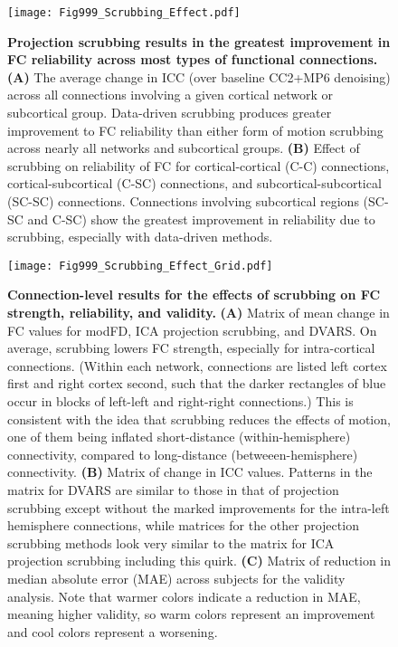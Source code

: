 \documentclass{article}
\begin{document}
\begin{figure}
    \centering
    \texttt{[image: Fig999\_Scrubbing\_Effect.pdf]}
    \caption{\small \textbf{Projection scrubbing results in the greatest improvement in FC reliability across most types of functional connections.}
      \textbf{(A)} The average change in ICC (over baseline CC2+MP6 denoising)
      across all connections involving a given cortical network or subcortical
      group. Data-driven scrubbing produces greater improvement to FC reliability
      than either form of motion scrubbing across nearly all networks
      and subcortical groups. \textbf{(B)} Effect of scrubbing on reliability of
      FC for cortical-cortical (C-C) connections, cortical-subcortical (C-SC)
      connections, and subcortical-subcortical (SC-SC) connections. Connections
      involving subcortical regions (SC-SC and C-SC) show the greatest
      improvement in reliability due to scrubbing, especially with data-driven
      methods.}
    \label{app:fig:ICCexpanded}
\end{figure}

\begin{figure}
    \centering
    \texttt{[image: Fig999\_Scrubbing\_Effect\_Grid.pdf]}
    \caption{\small \textbf{Connection-level results for the effects of scrubbing on FC strength, reliability, and validity.} \textbf{(A)} Matrix of mean change in FC values for modFD, ICA projection scrubbing, and DVARS. On average, scrubbing lowers FC strength, especially for intra-cortical connections. (Within each network, connections are listed left cortex first and right cortex second, such that the darker rectangles of blue occur in blocks of left-left and right-right connections.) This is consistent with the idea that scrubbing reduces the effects of motion, one of them being inflated short-distance (within-hemisphere) connectivity, compared to long-distance (betweeen-hemisphere) connectivity. \textbf{(B)} Matrix of change in ICC values. Patterns in the matrix for DVARS are similar to those in that of projection scrubbing except without the marked improvements for the intra-left hemisphere connections, while matrices for the other projection scrubbing methods look very similar to the matrix for ICA projection scrubbing including this quirk. \textbf{(C)} Matrix of reduction in median absolute error (MAE) across subjects for the validity analysis. Note that warmer colors indicate a reduction in MAE, meaning higher validity, so warm colors represent an improvement and cool colors represent a worsening.} 
    \label{app:fig:scrubEffectGrid}
\end{figure}
\end{document}
